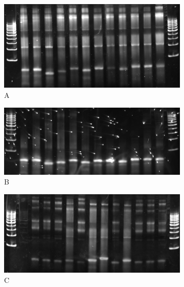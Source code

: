 \documentclass[parskip=full, numbers=noenddot]{scrreprt}
\begin{document}
\begin{figure}[htpb]
  \centering
  \begin{subfigure}[htpb]{0.4\textwidth}
    \centering
    \includegraphics[width=\textwidth]{dreamtaq}
    \caption{A}
    \label{fig:barcoding_a}
  \end{subfigure}
  \begin{subfigure}[htpb]{0.4\textwidth}
    \centering
    \includegraphics[width=\textwidth]{phusion_old_a}
    \caption{B}
    \label{fig:barcoding_b}
  \end{subfigure}
  \begin{subfigure}[htpb]{0.4\textwidth}
    \centering
    \includegraphics[width=\textwidth]{phusion_new_a}
    \caption{C}
    \label{fig:barcoding_c}
  \end{subfigure}
  \begin{subfigure}[htpb]{0.4\textwidth}

\end{subfigure}
\end{figure}
\end{document}
